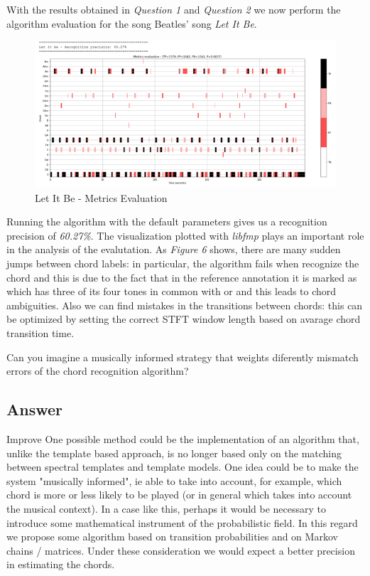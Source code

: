 \documentclass[
	12pt, %
]{fphw}
\begin{document}
{With the results obtained in \emph{Question 1} and \emph{Question 2} we now perform the algorithm evaluation for the song Beatles' song \emph{Let It Be}.

\begin{figure}[H]
 \centering
 \includegraphics[scale=1]{./images/3_let_it_be_metrics.png}
 \caption{Let It Be - Metrics Evaluation}
\end{figure}

Running the algorithm with the default parameters gives us a recognition precision of \emph{60.27\%}. The visualization plotted with \emph{libfmp} plays an important role in the analysis of the evalutation. As \emph{Figure 6} shows, there are many sudden jumps between chord labels: in particular, the algorithm fails when recognize the  chord and this is due to the fact that in the reference annotation it is marked as  which has three of its four tones in common with  or  and this leads to chord ambiguities. Also we can find mistakes in the transitions between chords: this can be optimized by setting the correct STFT window length based on avarage chord transition time.

\begin{problem}
	Can you imagine a musically informed strategy that weights diferently mismatch errors of
the chord recognition algorithm?
\end{problem}

\subsection*{\color{blue}Answer}
\color{red}Improve\color{black}
One possible method could be the implementation of an algorithm that, unlike the template based approach, is no longer based only on the matching between spectral templates and template models. One idea could be to make the system "musically informed", ie able to take into account, for example, which chord is more or less likely to be played (or in general which takes into account the musical context). In a case like this, perhaps it would be necessary to introduce some mathematical instrument of the probabilistic field. In this regard we propose some algorithm based on transition probabilities and on Markov chains / matrices. Under these consideration we would expect a better precision in estimating the chords.

}
\end{document}
